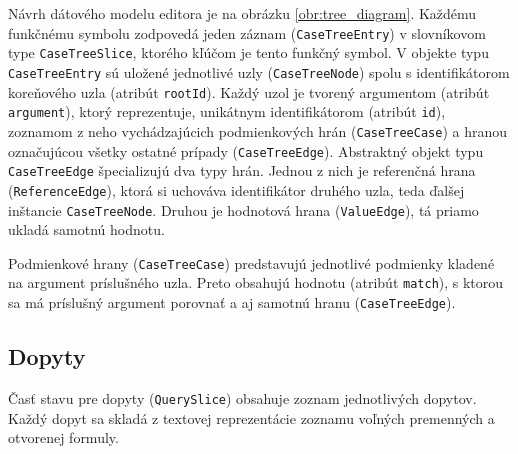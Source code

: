 Návrh dátového modelu editora je na obrázku \ref{obr:tree_diagram}. Každému funkčnému symbolu zodpovedá jeden záznam (\texttt{CaseTreeEntry}) v slovníkovom type \texttt{CaseTreeSlice}, ktorého kľúčom je tento funkčný symbol. V objekte typu \texttt{CaseTreeEntry} sú uložené jednotlivé uzly (\texttt{CaseTreeNode}) spolu s identifikátorom koreňového uzla (atribút \texttt{rootId}). Každý uzol je tvorený argumentom (atribút \texttt{argument}), ktorý reprezentuje, unikátnym identifikátorom (atribút \texttt{id}), zoznamom z neho vychádzajúcich podmienkových hrán (\texttt{CaseTreeCase}) a hranou označujúcou všetky ostatné prípady (\texttt{CaseTreeEdge}). Abstraktný objekt typu \texttt{CaseTreeEdge} špecializujú dva typy hrán. Jednou z nich je referenčná hrana (\texttt{ReferenceEdge}), ktorá si uchováva identifikátor druhého uzla, teda ďalšej inštancie \texttt{CaseTreeNode}. Druhou je hodnotová hrana (\texttt{ValueEdge}), tá priamo ukladá samotnú hodnotu.

Podmienkové hrany (\texttt{CaseTreeCase}) predstavujú jednotlivé podmienky kladené na argument príslušného uzla. Preto obsahujú hodnotu (atribút \texttt{match}), s ktorou sa má príslušný argument porovnať a aj samotnú hranu (\texttt{CaseTreeEdge}).





\subsection{Dopyty}
Časť stavu pre dopyty (\texttt{QuerySlice}) obsahuje zoznam jednotlivých dopytov. Každý dopyt sa skladá z textovej reprezentácie zoznamu voľných premenných a otvorenej formuly.
